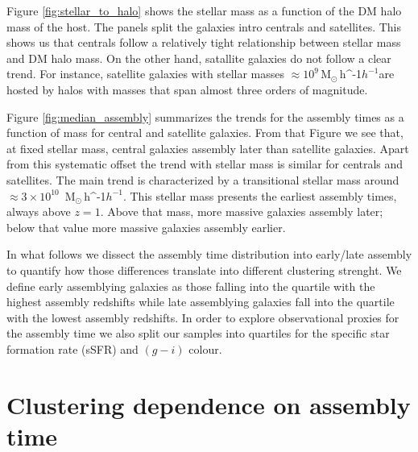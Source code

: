 \documentclass[fleqn,usenatbib]{mnras}
\newcommand{\Msunh}{\,{\rm M}$_{\odot}$\,\ifmmode h^{-1}\else $h^{-1}$\fi}
\begin{document}
Figure \ref{fig:stellar_to_halo} shows the stellar mass as a function
of the DM halo mass of the host.
The panels split the galaxies intro centrals and satellites. 
This shows us that centrals follow a relatively tight relationship
between stellar mass and DM halo mass.
On the other hand, satallite galaxies do not follow a clear trend.
For instance, satellite galaxies with stellar masses $\approx
10^{9}$\Msunh are hosted by halos with masses that span almost three
orders of magnitude.

Figure \ref{fig:median_assembly} summarizes the trends for the
assembly times as a function of mass for central and satellite
galaxies.
From that Figure we see that, at fixed stellar mass, central galaxies
assembly later than  satellite galaxies.
Apart from this systematic offset the trend with stellar mass is
similar for centrals and satellites.
The main trend is characterized by a transitional stellar mass around 
$\approx 3\times 10^{10}$ \Msunh.
This stellar mass presents the earliest assembly times, always above $z=1$.
Above that mass, more massive galaxies assembly later; below that
value more massive galaxies assembly earlier.

In what follows we dissect the assembly time distribution into
early/late assembly to quantify how those differences translate into
different clustering strenght.
We define early assemblying galaxies as those falling into the
quartile with the highest assembly redshifts while late assemblying
galaxies fall into the quartile with the lowest assembly redshifts.
In order to explore observational proxies for the assembly time we
also split our samples into quartiles for the specific star formation
rate (sSFR) and $(g-i)$ colour. 

\section{Clustering dependence on assembly time}
\label{sec:results}
\end{document}
